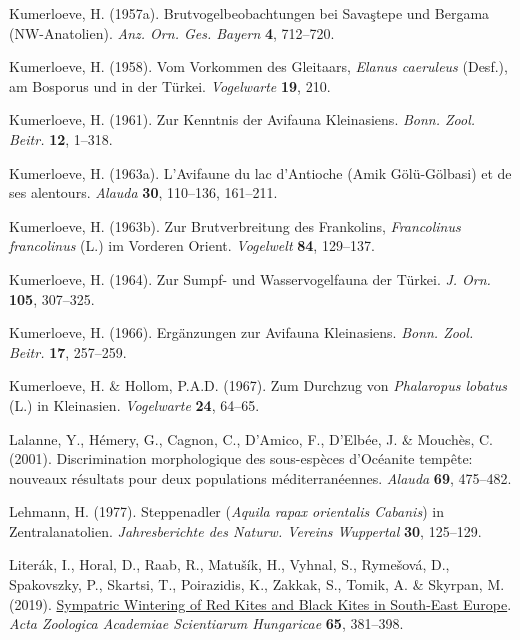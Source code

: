 \documentclass[
  a4paper,
  DIV=11,
  numbers=noendperiod]{scrreprt}
\newlength{\cslhangindent}
\newenvironment{CSLReferences}[2] %
 {\begin{list}{}{%
  \setlength{\itemindent}{0pt}
  \setlength{\leftmargin}{0pt}
  \setlength{\parsep}{0pt}
  \ifodd #1
   \setlength{\leftmargin}{\cslhangindent}
   \setlength{\itemindent}{-1\cslhangindent}
  \fi
  \setlength{\itemsep}{#2\baselineskip}}}
 {\end{list}}
\begin{document}
\begin{CSLReferences}{1}{1}
Kumerloeve, H. (1957a). {Brutvogelbeobachtungen bei Savaştepe und
Bergama (NW-Anatolien)}. \emph{Anz. Orn. Ges. Bayern} \textbf{4},
712--720.

Kumerloeve, H. (1958). {Vom Vorkommen des Gleitaars, \emph{Elanus
caeruleus} (Desf.), am Bosporus und in der Türkei}. \emph{Vogelwarte}
\textbf{19}, 210.

Kumerloeve, H. (1961). {Zur Kenntnis der Avifauna Kleinasiens}.
\emph{Bonn. Zool. Beitr.} \textbf{12}, 1--318.

Kumerloeve, H. (1963a). {L'Avifaune du lac d'Antioche (Amik
Gölü-Gölbasi) et de ses alentours}. \emph{Alauda} \textbf{30}, 110--136,
161--211.

Kumerloeve, H. (1963b). {Zur Brutverbreitung des Frankolins,
\emph{Francolinus francolinus} (L.) im Vorderen Orient}.
\emph{Vogelwelt} \textbf{84}, 129--137.

Kumerloeve, H. (1964). {Zur Sumpf- und Wasservogelfauna der Türkei}.
\emph{J. Orn.} \textbf{105}, 307--325.

Kumerloeve, H. (1966). {Ergänzungen zur Avifauna Kleinasiens}.
\emph{Bonn. Zool. Beitr.} \textbf{17}, 257--259.

Kumerloeve, H. \& Hollom, P.A.D. (1967). {Zum Durchzug von
\emph{Phalaropus lobatus} (L.) in Kleinasien}. \emph{Vogelwarte}
\textbf{24}, 64--65.

Lalanne, Y., Hémery, G., Cagnon, C., D'Amico, F., D'Elbée, J. \&
Mouchès, C. (2001). {Discrimination morphologique des sous-espèces
d'Océanite tempête: nouveaux résultats pour deux populations
méditerranéennes}. \emph{Alauda} \textbf{69}, 475--482.

Lehmann, H. (1977). {Steppenadler (\emph{Aquila rapax orientalis
Cabanis}) in Zentralanatolien}. \emph{Jahresberichte des Naturw. Vereins
Wuppertal} \textbf{30}, 125--129.

Literák, I., Horal, D., Raab, R., Matušík, H., Vyhnal, S., Rymešová, D.,
Spakovszky, P., Skartsi, T., Poirazidis, K., Zakkak, S., Tomik, A. \&
Skyrpan, M. (2019).
\href{https://doi.org/10.17109/AZH.65.4.381.2019}{{Sympatric Wintering
of Red Kites and Black Kites in South-East Europe}}. \emph{Acta
Zoologica Academiae Scientiarum Hungaricae} \textbf{65}, 381--398.


\end{CSLReferences}
\end{document}
